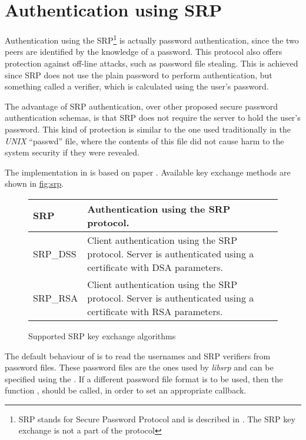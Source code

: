 \section{Authentication using SRP}

Authentication using the SRP\footnote{SRP stands for Secure Password Protocol and 
is described in \cite{RFC2945}. The SRP key exchange is not a part of the \tlsI{} protocol}
is actually password authentication, since the two peers are identified by the knowledge of a password. 
This protocol also offers protection against off-line attacks, such as password 
file stealing. 
This is achieved since SRP does not use the plain password to perform authentication, 
but something called a verifier, which is calculated using the user's password.
\par The advantage of SRP authentication, over other proposed secure password 
authentication schemas, is that SRP does not require the server to hold
the user's password. This kind of protection is similar to the one used traditionally
in the \emph{UNIX} ``passwd'' file, where the contents of this file did not cause
harm to the system security if they were revealed.
\par
The implementation in \gnutls{} is based on paper \cite{TLSSRP}.
Available key exchange methods are shown in \hyperref{figure}{figure }{}{fig:srp}.

\begin{figure}[hbtp]
\begin{tabular}{|l|p{9cm}|}

\hline
SRP & Authentication using the SRP protocol. 
\\
\hline
SRP\_DSS & Client authentication using the SRP protocol. Server is 
authenticated using a certificate with DSA parameters.
\\
\hline
SRP\_RSA & Client authentication using the SRP protocol. Server is 
authenticated using a certificate with RSA parameters.
\\
\hline
\end{tabular}

\caption{Supported SRP key exchange algorithms}
\label{fig:srp}

\end{figure}

The default behaviour of \gnutls{} is to read the usernames and
SRP verifiers from password files. These password files are the ones used
by \emph{libsrp} and can be specified using the
.
If a different password file format is to be used, then the 
function ,
should be called, in order to set an appropriate callback.

